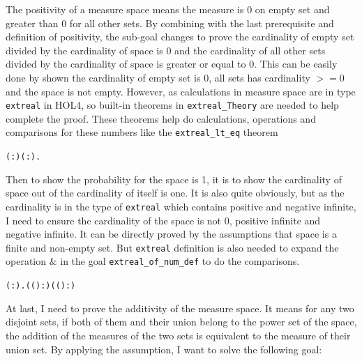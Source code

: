 \documentclass{article}
\begin{document}
The positivity of a measure space means the measure is 0 on empty set and greater than 0 for all other sets. By combining
with the last prerequisite and definition of positivity, the sub-goal changes to prove the cardinality of empty set divided
by the cardinality of space is 0 and the cardinality of all other sets divided by the cardinality of space is greater
or equal to 0. This can be easily done by shown the cardinality of empty set is 0, all sets has cardinality $>=0$ and
the space is not empty. However, as calculations in measure space are in type \verb|extreal| in HOL4, so built-in theorems
in \verb|extreal_Theory| are needed to help complete the proof. These theorems help do calculations, operations and
comparisons for these numbers like the \verb|extreal_lt_eq| theorem

\begin{alltt}
  \HOLTokenTurnstile{} \HOLSymConst{\HOLTokenForall{}}( :) ( :).   \HOLSymConst{\HOLTokenLt{}}   \HOLSymConst{\HOLTokenEquiv{}}  \HOLSymConst{\HOLTokenLt{}} 
\end{alltt}

Then to show the probability for the space is 1, it is to show the cardinality of space out of the cardinality of itself
is one. It is also quite obviously, but as the cardinality is in the type of \verb|extreal| which contains positive and
negative infinite, I need to ensure the cardinality of the space is not 0, positive infinite and negative infinite. It
can be directly proved by the assumptions that space is a finite and non-empty set. But \verb|extreal| definition is also needed
to expand the operation $\&$ in the goal \verb|extreal_of_num_def| to do the comparisons.

\begin{alltt}
  \HOLTokenTurnstile{} \HOLSymConst{\HOLTokenForall{}}( :). ((\HOLSymConst{\&}) :) \HOLSymConst{=}  ((\HOLSymConst{\&}) :)
\end{alltt}

At last, I need to prove the additivity of the measure space. It means for any two disjoint sets, if both of them
and their union belong to the power set of the space, the addition of the measures of the two sets is equivalent
to the measure of their union set. By applying the assumption, I want to solve the following goal:
\end{document}
